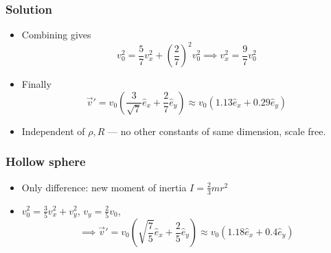 \documentclass[aspectratio=169]{beamer}
\begin{document}
    \begin{frame}
        \frametitle{Solution}
        
        \begin{itemize}
            \item Combining gives
            $$
                v_0^2 = \frac{5}{7} v_x^2 + \left(\frac{2}{7}\right)^2 v_0^2
                \implies v_x^2 = \frac{9}{7} v_0^2
            $$
            \item Finally 
            $$
                \vec v' = v_0 \left( \frac{3}{\sqrt 7}\hat e_x + \frac{2}{7} \hat e_y\right)
                \approx v_0(1.13 \hat e_x + 0.29 \hat e_y)
            $$
            \item Independent of $\rho, R$ --- no other constants of same dimension, scale free.
        \end{itemize}
    \end{frame}

    \begin{frame}
        \frametitle{Hollow sphere}
        
        \begin{itemize}
            \item Only difference: new moment of inertia $I = \frac{2}{3} m r^2$
            \item $v_0^2 = \frac{3}{5}v_x^2 + v_y^2$, $v_y = \frac{2}{5}v_0$, \\
            $$
                \implies \vec v' = v_0 \left(  \sqrt{\frac{7}{5}} \hat e_x + \frac{2}{5} \hat e_y\right)
                \approx v_0(1.18 \hat e_x + 0.4 \hat e_y)
            $$
        \end{itemize}
    \end{frame}
\end{document}
